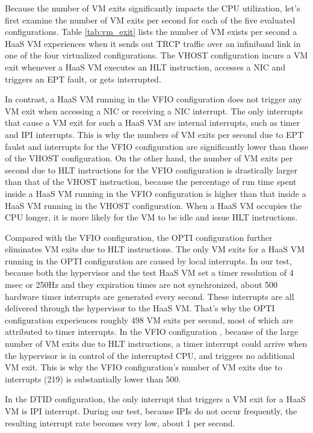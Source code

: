 Because the number of VM exits significantly impacts the CPU utilization, 
let's first examine the number of VM exits per second for each of the five 
evaluated configurations. 
Table \ref{tab:vm_exit}  lists the number of VM exists per second a HaaS VM experiences 
when it sends out TRCP traffic over an infiniband link in one of the four virtualized 
configurations. 
The VHOST configuration incurs a VM exit whenever a HaaS VM executes an HLT instruction,
accesses a NIC and triggers an EPT fault, or gets interrupted. 

In contrast, a HaaS VM running in the VFIO configuration does not trigger any VM exit when
accessing a NIC or receiving a NIC interrupt.
The only interrupts that cause a VM exit for such a HaaS VM are internal interrupts, such
as timer and IPI interrupts.
This is why the numbers of VM exits per second due to EPT faulst and interrupts  for the VFIO 
configuration are significantly lower than those of the VHOST configuration.
On the other hand, the number of VM exits per second due to HLT instructions for the VFIO configuration
is drastically larger than that of the VHOST instruction, because 
the percentage of run time spent inside a HaaS VM running in the VFIO configuration 
is higher than that inside a HaaS VM running in the VHOST configuration.
When a HaaS VM occupies the CPU longer, it is more likely for the VM to be idle and issue HLT instructions.

 Compared with the VFIO configuration, the OPTI configuration further eliminates VM exits due to HLT instructions.
 The only VM exits for a HaaS VM running in the OPTI configuration are caused by local interrupts.
 In our test, because both the hypervisor and the test HaaS VM set a timer 
 resolution of 4 msec or 250Hz and they expiration times
 are not synchronized, about 500 hardware timer interrupts are generated every second.
 These interrupts are all delivered through the hypervisor to the HaaS VM. That's why the OPTI configuration 
 experiences roughly 498 VM exits per second, most of which are attributed to timer interrupts.
 In the VFIO configuration , because of the large number of VM exits due to HLT instructions, a timer interrupt could arrive when the hypervisor is in control of the interrupted CPU, and triggers no additional VM exit.
 This is why the VFIO configuration's number of  VM exits  due to interrupts (219) is substantially lower than 500. 
  
In the DTID configuration, the only interrupt that triggers a VM exit for a HaaS VM is IPI interrupt. 
During our test, because IPIs do not occur frequently,  the resulting interrupt rate becomes very low, about 1 per second. 



